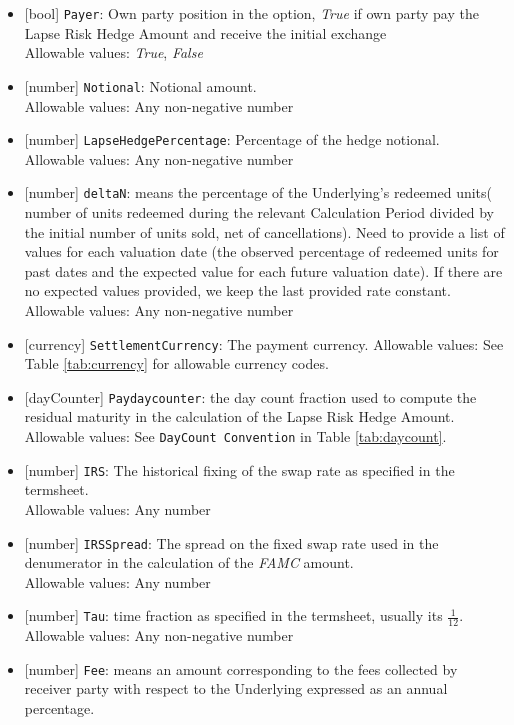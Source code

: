 \begin{itemize}
  \item{}[bool] \lstinline!Payer!: Own party position in the option, \emph{True} if own party pay the Lapse Risk Hedge Amount and receive the initial exchange \\
  Allowable values: \emph{True}, \emph{False}
  \item{}[number] \lstinline!Notional!: Notional amount. \\
  Allowable values: Any non-negative number
  \item{}[number] \lstinline!LapseHedgePercentage!: Percentage of the hedge notional. \\
  Allowable values: Any non-negative number
  \item{}[number] \lstinline!deltaN!: means the  percentage  of  the  Underlying’s  redeemed  units(  number  of  units redeemed during the relevant Calculation Period divided by the initial number of units sold, net of cancellations).
  Need to provide a list of values for each valuation date (the observed percentage of redeemed units for past dates and  the expected value for each future valuation date). If there are no expected values provided, we keep the last provided rate constant.
  Allowable values: Any non-negative number
  \item{}[currency] \lstinline!SettlementCurrency!: The payment currency.
  Allowable values: See Table \ref{tab:currency} for allowable currency codes.
  \item{}[dayCounter] \lstinline!Paydaycounter!:  the day count fraction used to compute the residual maturity in the calculation of the Lapse Risk Hedge Amount. \\
  Allowable values: See \lstinline!DayCount Convention! in Table \ref{tab:daycount}.
  \item{}[number] \lstinline!IRS!: The historical fixing of the swap rate as specified in the termsheet. \\
  Allowable values: Any number
  \item{}[number] \lstinline!IRSSpread!: The spread on the fixed swap rate used in the denumerator in the calculation of the \emph{FAMC} amount.\\
  Allowable values: Any number
  \item{}[number] \lstinline!Tau!: time fraction as specified in the termsheet, usually its $\frac{1}{12}$. \\
  Allowable values: Any non-negative number
  \item{}[number] \lstinline!Fee!: means  an  amount  corresponding  to  the  fees  collected  by receiver party with respect to the Underlying expressed as an annual percentage. \\

\end{itemize}
